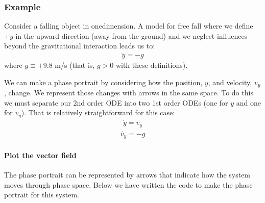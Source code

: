 \documentclass[letterpaper,10pt,english]{jupyterBook}
\begin{document}
\subsubsection{Example}
\label{\detokenize{content/2_oscillations/activity-SHO_and_dynamical_systems:example}}
\sphinxAtStartPar
Consider a falling object in one\sphinxhyphen{}dimension. A model for free fall where we define \(+y\) in the upward direction (away from the ground) and we neglect influences beyond the gravitational interaction leads us to:
\begin{equation*}
\begin{split}\ddot{y} = -g\end{split}
\end{equation*}
\sphinxAtStartPar
where \(g \equiv +9.8\) m/s (that is, \(g>0\) with these definitions).

\sphinxAtStartPar
We can make a phase portrait by considering how the position, \(y\), and velocity, \(v_y\), change. We represent those changes with arrows in the same space. To do this we must separate our 2nd order ODE into two 1st order ODEs (one for \(y\) and one for \(v_y\)). That is relatively straightforward for this case:
\begin{equation*}
\begin{split}\dot{y} = v_y\end{split}
\end{equation*}\begin{equation*}
\begin{split}\dot{v_y} = -g\end{split}
\end{equation*}

\paragraph{Plot the vector field}
\label{\detokenize{content/2_oscillations/activity-SHO_and_dynamical_systems:plot-the-vector-field}}
\sphinxAtStartPar
The phase portrait can be represented by arrows that indicate how the system moves through phase space. Below we have written the code to make the phase portrait for this system.
\end{document}
